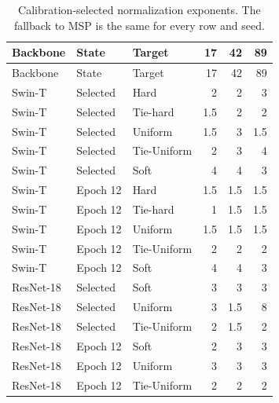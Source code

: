 \begingroup\small\setlength{\tabcolsep}{4pt}\setlength{\LTcapwidth}{\linewidth}\renewcommand{\arraystretch}{.97}
\begin{longtable}{lllrrr}
\caption{Calibration-selected normalization exponents. The fallback to MSP is the same for every row and seed.}\label{tab:normalization-exponents}\\
\toprule Backbone & State & Target & 17 & 42 & 89\\\midrule\endfirsthead
\toprule Backbone & State & Target & 17 & 42 & 89\\\midrule\endhead
Swin-T & Selected & Hard & 2 & 2 & 3\\
Swin-T & Selected & Tie-hard & 1.5 & 2 & 2\\
Swin-T & Selected & Uniform & 1.5 & 3 & 1.5\\
Swin-T & Selected & Tie-Uniform & 2 & 3 & 4\\
Swin-T & Selected & Soft & 4 & 4 & 3\\
Swin-T & Epoch 12 & Hard & 1.5 & 1.5 & 1.5\\
Swin-T & Epoch 12 & Tie-hard & 1 & 1.5 & 1.5\\
Swin-T & Epoch 12 & Uniform & 1.5 & 1.5 & 1.5\\
Swin-T & Epoch 12 & Tie-Uniform & 2 & 2 & 2\\
Swin-T & Epoch 12 & Soft & 4 & 4 & 3\\
ResNet-18 & Selected & Soft & 3 & 3 & 3\\
ResNet-18 & Selected & Uniform & 3 & 1.5 & 8\\
ResNet-18 & Selected & Tie-Uniform & 2 & 1.5 & 2\\
ResNet-18 & Epoch 12 & Soft & 2 & 3 & 3\\
ResNet-18 & Epoch 12 & Uniform & 3 & 3 & 3\\
ResNet-18 & Epoch 12 & Tie-Uniform & 2 & 2 & 2\\
\bottomrule\end{longtable}\endgroup

